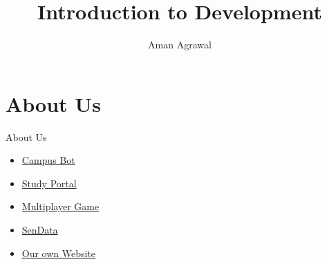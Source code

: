 \def\handout{0}   %
\def\notes{0}     %
\def\adminstuff{0}

%
\date{}
\usepackage{hyperref}


\begin{frame}
\title{Introduction to Development}
\author{Aman Agrawal}
\titlepage
\end{frame}

\section{About Us}
    \begin{frame}{About Us}
        \begin{itemize}
            \item<+-> \href{https://aman71197.github.io/CampusBot/}{Campus Bot}
            \item<+-> \href{http://iitd.info/study_portal}{Study Portal}            
            \item<+-> \href{http://10.17.51.99:3000/}{Multiplayer Game}
            \item<+-> \href{http://sendata.herokuapp.com/}{SenData}
            \item<+-> \href{http://www.cse.iitd.ernet.in/devclub/}{Our own Website}
        \end{itemize}
    \end{frame}

